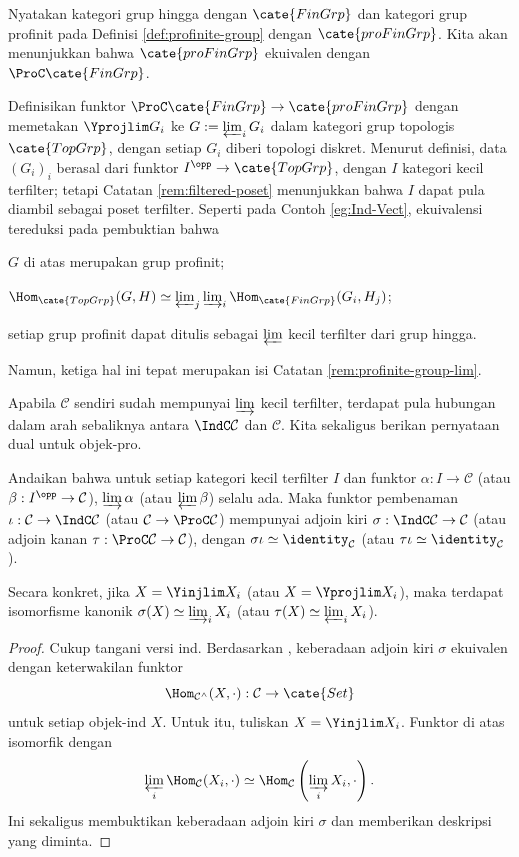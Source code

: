 \begin{example}\label{eg:profinite-group}
	Nyatakan kategori grup hingga dengan $\cate{FinGrp}$ dan kategori grup profinit pada Definisi \ref{def:profinite-group} dengan $\cate{proFinGrp}$. Kita akan menunjukkan bahwa $\cate{proFinGrp}$ ekuivalen dengan $\ProC\cate{FinGrp}$.
	
	Definisikan funktor $\ProC\cate{FinGrp}\to\cate{proFinGrp}$ dengan memetakan $\Yprojlim G_i$ ke $G:=\varprojlim_iG_i$ dalam kategori grup topologis $\cate{TopGrp}$, dengan setiap $G_i$ diberi topologi diskret. Menurut definisi, data $(G_i)_i$ berasal dari funktor $I^{\opp}\to\cate{TopGrp}$, dengan $I$ kategori kecil terfilter; tetapi Catatan \ref{rem:filtered-poset} menunjukkan bahwa $I$ dapat pula diambil sebagai poset terfilter. Seperti pada Contoh \ref{eg:Ind-Vect}, ekuivalensi tereduksi pada pembuktian bahwa
	\begin{compactitem}
		\item $G$ di atas merupakan grup profinit;
		\item $\Hom_{\cate{TopGrp}}(G,H)\simeq\varprojlim_j\varinjlim_i\Hom_{\cate{FinGrp}}(G_i,H_j)$;
		\item setiap grup profinit dapat ditulis sebagai $\varprojlim$ kecil terfilter dari grup hingga.
	\end{compactitem}
	Namun, ketiga hal ini tepat merupakan isi Catatan \ref{rem:profinite-group-lim}.
\end{example}

Apabila $\mathcal{C}$ sendiri sudah mempunyai $\varinjlim$ kecil terfilter, terdapat pula hubungan dalam arah sebaliknya antara $\IndC\mathcal{C}$ dan $\mathcal{C}$. Kita sekaligus berikan pernyataan dual untuk objek-pro.

\begin{proposition}\label{prop:Ind-adjunction}
	Andaikan bahwa untuk setiap kategori kecil terfilter $I$ dan funktor $\alpha:I\to\mathcal{C}$ (atau $\beta:I^{\opp}\to\mathcal{C}$), $\varinjlim\alpha$ (atau $\varprojlim\beta$) selalu ada. Maka funktor pembenaman $\iota:\mathcal{C}\to\IndC\mathcal{C}$ (atau $\mathcal{C}\to\ProC\mathcal{C}$) mempunyai adjoin kiri $\sigma:\IndC\mathcal{C}\to\mathcal{C}$ (atau adjoin kanan $\tau:\ProC\mathcal{C}\to\mathcal{C}$), dengan $\sigma\iota\simeq\identity_{\mathcal{C}}$ (atau $\tau\iota\simeq\identity_{\mathcal{C}}$).
	
	Secara konkret, jika $X=\Yinjlim X_i$ (atau $X=\Yprojlim X_i$), maka terdapat isomorfisme kanonik $\sigma(X)\simeq\varinjlim_iX_i$ (atau $\tau(X)\simeq\varprojlim_iX_i$).
\end{proposition}
\begin{proof}
	Cukup tangani versi ind. Berdasarkan \cite[Proposisi 2.6.9]{Li1}, keberadaan adjoin kiri $\sigma$ ekuivalen dengan keterwakilan funktor
	\[ \Hom_{\mathcal{C}^\wedge}(X, \cdot): \mathcal{C} \to \cate{Set} \]
untuk setiap objek-ind $X$. Untuk itu, tuliskan $X=\Yinjlim X_i$. Funktor di atas isomorfik dengan
	\[ \varprojlim_i \Hom_{\mathcal{C}}(X_i, \cdot) \simeq \Hom_{\mathcal{C}}\left( \varinjlim_i X_i, \cdot\right). \]
Ini sekaligus membuktikan keberadaan adjoin kiri $\sigma$ dan memberikan deskripsi yang diminta.
\end{proof}

